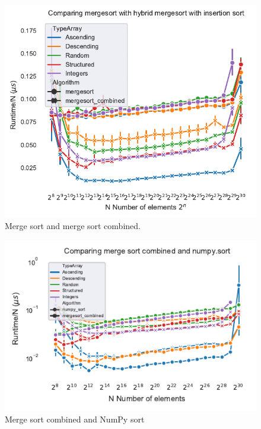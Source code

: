 \documentclass[sigconf, nonacm, natbib, screen, balance=False]{acmart}
\begin{document}
\begin{figure}[]
  \centering
  \includegraphics[scale=0.9]{runtime_per_n_merge&combined.pdf}
  \caption{Merge sort and merge sort combined.}
  \label{fig:merge_mergecomb}
\end{figure}

\begin{figure}[]
  \centering
  \includegraphics[scale=0.9]{runtime_per_n_combined&np.pdf}
  \caption{Merge sort combined and NumPy sort}
  \label{fig:msc_np}
\end{figure}
\end{document}
